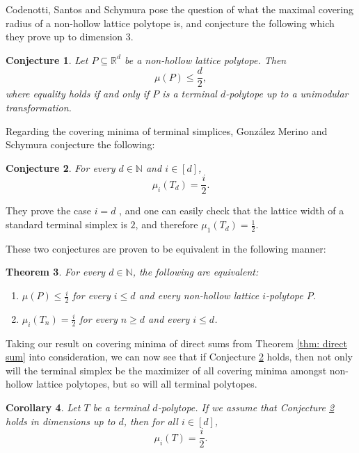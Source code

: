 \documentclass{amsart}
\newtheorem{theorem}{Theorem}[section]
\newtheorem{corollary}[theorem]{Corollary}
\newtheorem{conjecture}[theorem]{Conjecture}
\theoremstyle{definition}
\theoremstyle{remark}
\newcommand{\R}{\mathbb{R}}
\newcommand{\N}{\mathbb{N}}
\begin{document}
Codenotti, Santos and Schymura \cite{CodenottiSantosSchymura} pose the question of what the maximal covering radius of a non-hollow lattice polytope is, and conjecture the following which they prove up to dimension 3.

\begin{conjecture}\label{conj A}
\cite[Conj. A]{CodenottiSantosSchymura}
Let $P\subseteq \R^d$ be a non-hollow lattice polytope. Then
$$\mu(P)\leqslant \frac{d}{2},$$
where equality holds if and only if $P$ is a terminal $d$-polytope up to a unimodular transformation.
\end{conjecture}



Regarding the covering minima of terminal simplices, Gonz\' alez Merino and Schymura \cite{MerinoSchymura} conjecture the following:
\begin{conjecture}\cite[Rem. 4.9]{MerinoSchymura} \label{conj B}
For every $d\in \N$ and $i\in [d]$,
$$\mu_i(T_d)=\frac{i}{2}.$$
\end{conjecture}

They prove the case $i=d$ \cite[Prop. 4.8]{MerinoSchymura}, and one can easily check that the lattice width of a standard terminal simplex is $2$, and therefore $\mu_1(T_d)=\frac{1}{2}$.

These two conjectures are proven to be equivalent in the following manner:

\begin{theorem}\cite[Thm. 1.2]{CodenottiSantosSchymura}
\label{conjecture equivalence}
For every $d\in \N$, the following are equivalent:
\begin{enumerate}[label=\roman*)]
\item $\mu(P)\leqslant\frac{i}{2}$ for every $i\leqslant d$ and every non-hollow lattice $i$-polytope $P$.

\item $\mu_i(T_n)=\frac{i}{2}$ for every $n\geqslant d$ and every $i\leqslant d$.

\end{enumerate}
\end{theorem}


Taking our result on covering minima of direct sums from Theorem \ref{thm: direct sum} into consideration, we can now see that if Conjecture \ref{conj B} holds, then not only will the terminal simplex be the maximizer of all covering minima amongst non-hollow lattice polytopes, but so will all terminal polytopes. 

\begin{corollary}\label{terminal polytope}
Let $T$ be a terminal $d$-polytope. If we assume that Conjecture \ref{conj B} holds in dimensions up to $d$, then for all $i\in [d]$,
$$\mu_i(T)=\frac{i}{2}.$$
\end{corollary}
\end{document}
